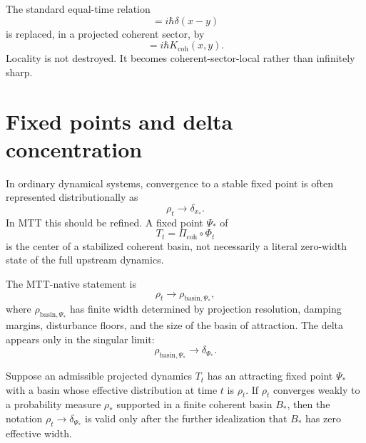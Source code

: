\documentclass[11pt]{article}
\begin{document}
\begin{example}
The standard equal-time relation
\begin{equation}
[\phi(t,x),\pi(t,y)]=i\hbar\delta(x-y)
\end{equation}
is replaced, in a projected coherent sector, by
\begin{equation}
[\phi_{\mathrm{coh}}(t,x),\pi_{\mathrm{coh}}(t,y)]
=i\hbar K_{\mathrm{coh}}(x,y).
\end{equation}
Locality is not destroyed.  It becomes coherent-sector-local rather than infinitely sharp.
\end{example}

\section{Fixed points and delta concentration}

In ordinary dynamical systems, convergence to a stable fixed point is often represented
distributionally as
\begin{equation}
\rho_t\to \delta_{x_\ast}.
\end{equation}
In MTT this should be refined.  A fixed point \(\Psi_\ast\) of
\begin{equation}
T_t=\Pi_{\mathrm{coh}}\circ\Phi_t
\end{equation}
is the center of a stabilized coherent basin, not necessarily a literal zero-width state of the
full upstream dynamics.

The MTT-native statement is
\begin{equation}
\rho_t\to \rho_{\mathrm{basin},\Psi_\ast},
\end{equation}
where \(\rho_{\mathrm{basin},\Psi_\ast}\) has finite width determined by projection resolution,
damping margins, disturbance floors, and the size of the basin of attraction.  The delta
appears only in the singular limit:
\begin{equation}
\rho_{\mathrm{basin},\Psi_\ast}\to\delta_{\Psi_\ast}.
\end{equation}

\begin{proposition}\label{prop:fixed-delta}
Suppose an admissible projected dynamics \(T_t\) has an attracting fixed point \(\Psi_\ast\)
with a basin whose effective distribution at time \(t\) is \(\rho_t\). If \(\rho_t\) converges
weakly to a probability measure \(\rho_\ast\) supported in a finite coherent basin
\(B_\ast\), then the notation \(\rho_t\to\delta_{\Psi_\ast}\) is valid only after the further
idealization that \(B_\ast\) has zero effective width.
\end{proposition}
\end{document}

